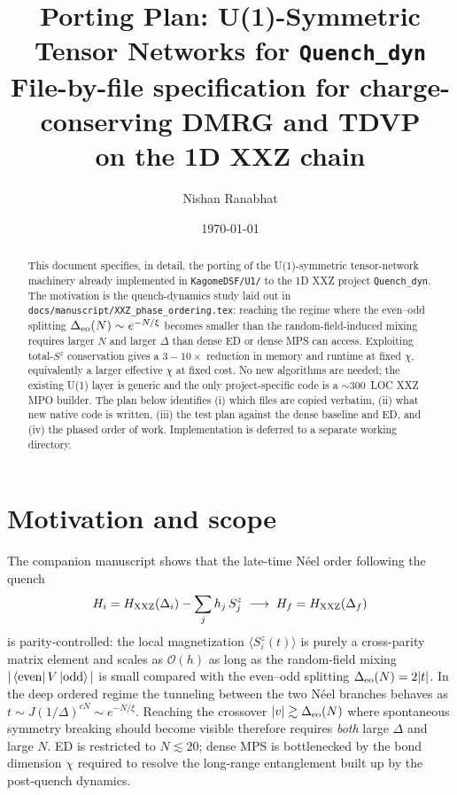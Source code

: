 \documentclass[11pt]{article}
\title{\textbf{Porting Plan: U(1)-Symmetric Tensor Networks for \texttt{Quench\_dyn}}\\
\large File-by-file specification for charge-conserving DMRG and TDVP\\ on the 1D XXZ chain}
\author{Nishan Ranabhat}
\date{\today}
\begin{document}
\maketitle

\begin{abstract}
This document specifies, in detail, the porting of the U(1)-symmetric
tensor-network machinery already implemented in \texttt{KagomeDSF/U1/} to the
1D XXZ project \texttt{Quench\_dyn}.  The motivation is the quench-dynamics
study laid out in \texttt{docs/manuscript/XXZ\_phase\_ordering.tex}: reaching
the regime where the even--odd splitting $\Delta_{\rm eo}(N) \sim e^{-N/\xi}$
becomes smaller than the random-field-induced mixing requires larger $N$ and
larger $\Delta$ than dense ED or dense MPS can access.  Exploiting total-$S^z$
conservation gives a $3\!-\!10\times$ reduction in memory and runtime at fixed
$\chi$, equivalently a larger effective $\chi$ at fixed cost.  No new
algorithms are needed; the existing U(1) layer is generic and the only
project-specific code is a $\sim 300$~LOC XXZ MPO builder.  The plan below
identifies (i) which files are copied verbatim, (ii) what new native code is
written, (iii) the test plan against the dense baseline and ED, and
(iv) the phased order of work.  Implementation is deferred to a separate
working directory.
\end{abstract}

\tableofcontents

\section{Motivation and scope}

The companion manuscript shows that the late-time N\'eel order following the
quench
\[
  H_i = H_{\rm XXZ}(\Delta_i) - \sum_j h_j\,S_j^z
  \;\longrightarrow\;
  H_f = H_{\rm XXZ}(\Delta_f)
\]
is parity-controlled: the local magnetization $\langle S_i^z(t)\rangle$ is
purely a cross-parity matrix element and scales as $\mathcal{O}(h)$ as long as
the random-field mixing $|\bra{\text{even}} V \ket{\text{odd}}|$ is small
compared with the even--odd splitting $\Delta_{\rm eo}(N) = 2|t|$.  In the
deep ordered regime the tunneling between the two N\'eel branches behaves as
$t \sim J(1/\Delta)^{cN} \sim e^{-N/\xi}$.  Reaching the crossover
$|v| \gtrsim \Delta_{\rm eo}(N)$ where spontaneous symmetry breaking should
become visible therefore requires \emph{both} large $\Delta$ and large $N$.
ED is restricted to $N \lesssim 20$; dense MPS is bottlenecked by the bond
dimension $\chi$ required to resolve the long-range entanglement built up by
the post-quench dynamics.
\end{document}

